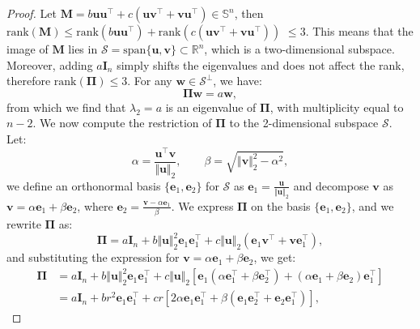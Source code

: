\documentclass[a4paper, 12pt]{article}
\newcommand{\T}{\top}
\def\bPi{\boldsymbol{\Pi}}
\def\be{\boldsymbol{e}}
\def\bu{\boldsymbol{u}}
\def\bv{\boldsymbol{v}}
\def\bI{\mathbf{I}}
\def\bM{\mathbf{M}}
\def\be{\mathbf{e}}
\def\bu{\mathbf{u}}
\def\bv{\mathbf{v}}
\begin{document}
\begin{proof}
Let $\boldsymbol{M}=b \boldsymbol{u} \boldsymbol{u}^{{\T}}+c\left(\boldsymbol{u} \boldsymbol{v}^{{\T}}+\boldsymbol{v} \boldsymbol{u}^{{\T}}\right)\in\mathbb{S}^n$, then $\mathrm{rank}(\boldsymbol{M}) \leq \mathrm{rank}\left(b \boldsymbol{u} \boldsymbol{u}^{{\T}}\right)+\mathrm{rank}\left(c\left(\boldsymbol{u} \boldsymbol{v}^{{\T}}+\boldsymbol{v} \boldsymbol{u}^{{\T}}\right)\right)$ $ \leq 3$. This means that the image of $\bM$ lies in $\mathcal{S} = \text{span}\{\boldsymbol{u}, \boldsymbol{v}\} \subset \mathbb{R}^n$, which is a two-dimensional subspace. Moreover, adding $a\bI_n$ simply shifts the eigenvalues and does not affect the rank, therefore $\mathrm{rank}(\bPi)\leq 3$.
%
For any $ \boldsymbol{w} \in \mathcal{S}^\perp$, we have:
\begin{equation*}
\boldsymbol{\Pi} \boldsymbol{w} = a \boldsymbol{w},
\end{equation*}
from which we find that $\lambda_2 = a$ is an eigenvalue of $\boldsymbol{\Pi}$, 
with multiplicity equal to $n-2$. We now compute the restriction of $\boldsymbol{\Pi}$ to the 2-dimensional subspace $\mathcal{S}$. Let:
\begin{equation*}
\alpha = \frac{\boldsymbol{u}^{\T} \boldsymbol{v}}{\Vert\bu\Vert_2}, \qquad \beta =\sqrt{\Vert\bv\Vert_2^2 - \alpha^2},
\end{equation*}
we define an orthonormal basis $\{\be_1, \be_2\}$ for $\mathcal{S}$ as $\be_1 = \frac{\bu}{\Vert\bu\Vert_2} $ and decompose $\bv$ as $\bv = \alpha\be_1 + \beta \be_2$, where $\be_2 = \frac{\bv - \alpha \be_1}{\beta}$.
%
We express $\boldsymbol{\Pi}$ on the basis $ \{\be_1, \be_2\} $, and we rewrite $ \boldsymbol{\Pi} $ as:
\begin{equation*}
\boldsymbol{\Pi} =a\boldsymbol{I}_n+b\Vert \bu\Vert_2^2\be_1\be_1^{\T} +c\Vert \bu\Vert_2 ( \be_1 \bv^{\T} + \bv \be_1^{\T}),
\end{equation*}
and substituting the expression for $\bv = \alpha \be_1 + \beta \be_2 $, we get:
\begin{equation*}
\begin{aligned}
\boldsymbol{\Pi} &= a \boldsymbol{I}_n+b\Vert \bu\Vert_2^2\be_1\be_1^{\T}+c\Vert \bu\Vert_2 \left[\be_1 (\alpha \be_1^{\T} + \beta \be_2^{\T}) + (\alpha \be_1 + \beta \be_2) \be_1^{\T} \right]\\
%
&= a\boldsymbol{I}_n+br^2\be_1\be_1^{\T}+cr \left[ 2\alpha \be_1 \be_1^{\T} + \beta (\be_1 \be_2^{\T} + \be_2 \be_1^{\T}) \right],
\end{aligned}
\end{equation*}

\end{proof}
\end{document}
